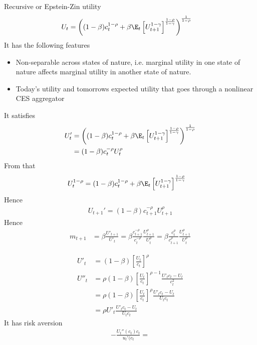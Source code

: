 \documentclass[12pt]{article}
\theoremstyle{plain}
\theoremstyle{definition}
\theoremstyle{remark}
\begin{document}
\begin{multicols*}{2}
Recursive or Epstein-Zin utility
\begin{align*}
  U_t
  &=
  \left(
  (1-\beta)c_t^{1-\rho}
  + \beta
  \E_t\left[U_{t+1}^{1-\gamma}\right]^{\frac{1-\rho}{1-\gamma}}
  \right)^{\frac{1}{1-\rho}}
\end{align*}
It has the following features
\begin{itemize}
  \item Non-separable across states of nature, i.e. marginal utility in
    one state of nature affects marginal utility in another state of
    nature.
  \item Today's utility and tomorrows expected utility that goes through
    a nonlinear CES aggregator
\end{itemize}
It satisfies
\begin{align*}
  U_t'
  &=
  \left(
  (1-\beta)c_t^{1-\rho}
  + \beta
  \E_t\left[U_{t+1}^{1-\gamma}\right]^{\frac{1-\rho}{1-\gamma}}
  \right)^{\frac{1}{1-\rho}}
  \\
  &=
  (1-\beta)
  c_t^{-\rho}
  U_t^{\rho}
\end{align*}
From that
\begin{align*}
  U_t^{1-\rho}
  &=
  (1-\beta)c_t^{1-\rho}
  + \beta
  \E_t\left[U_{t+1}^{1-\gamma}\right]^{\frac{1-\rho}{1-\gamma}}
\end{align*}
Hence
\begin{align*}
  U_{t+1}'
  =
  (1-\beta)
  c_{t+1}^{-\rho}
  U_{t+1}^{\rho}
\end{align*}
Hence
\begin{align*}
  m_{t+1}
  &= \beta \frac{U'_{t+1}}{U'_t}
  =
  \beta
  \frac{c_{t+1}^{-\rho}}{c_t^{-\rho}}
  \frac{U_{t+1}^{\rho}}{U_{t}^{\rho}}
  =
  \beta
  \frac{c_t^{\rho}}{c_{t+1}^{\rho}}
  \frac{U_{t+1}^{\rho}}{U_{t}^{\rho}}
\end{align*}



\begin{align*}
  U'_t
  &=
  (1-\beta)
  \left[
  \frac{U_t}{c_t}
  \right]^\rho
  \\
  U''_t
  &=
  \rho
  (1-\beta)
  \left[
  \frac{U_t}{c_t}
  \right]^{\rho-1}
  \frac{U'_tc_t - U_t}{c_t^2}
  \\
  &=
  \rho
  (1-\beta)
  \left[
  \frac{U_t}{c_t}
  \right]^{\rho}
  \frac{U'_tc_t - U_t}{U_tc_t}
  \\
  &=
  \rho
  U'_t
  \frac{U'_tc_t - U_t}{U_tc_t}
\end{align*}
It has risk aversion
\begin{align*}
  -\frac{U_t''(c_t)c_t}{u_t'(c_t}
  =
\end{align*}



\end{multicols*}
\end{document}
